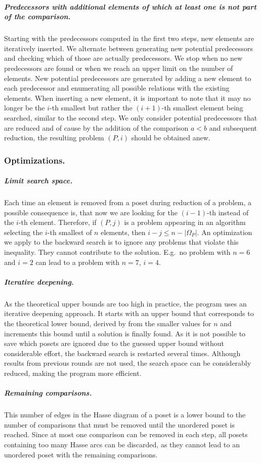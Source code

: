 \documentclass[a4paper,UKenglish,cleveref, autoref, thm-restate, anonymous]{lipics-v2021}
\begin{document}
\subparagraph{Predecessors with additional elements of which at least one is not part of the comparison.}
Starting with the predecessors computed in the first two steps, new elements are iteratively inserted.
We alternate between generating new potential predecessors and checking which of those are actually predecessors.
We stop when no new predecessors are found or when we reach an upper limit on the number of elements.
New potential predecessors are generated by adding a new element to each predecessor and enumerating all possible relations with the existing elements.
When inserting a new element, it is important to note that it may no longer be the $i$-th smallest but rather the $(i + 1)$-th smallest element being searched, similar to the second step.
We only consider potential predecessors that are reduced and of cause by the addition of the comparison $a < b$ and subsequent reduction, the resulting problem $(P, i)$ should be obtained anew.

\subsubsection{Optimizations.}

\subparagraph{Limit search space.}
Each time an element is removed from a poset during reduction of a problem, a possible consequence is, that now we are looking for the $(i-1)$-th instead of the $i$-th element.
Therefore, if $(P, j)$ is a problem appearing in an algorithm selecting the $i$-th smallest of $n$ elements, then $i - j \le n - |\Omega_P|$.
An optimization we apply to the backward search is to ignore any problems that violate this inequality.
They cannot contribute to the solution.
E.g.\ no problem with $n=6$ and $i=2$ can lead to a problem with $n=7$, $i=4$.

\subparagraph{Iterative deepening.}
As the theoretical upper bounds are too high in practice, the program uses an iterative deepening approach.
It starts with an upper bound that corresponds to the theoretical lower bound, derived by  from the smaller values for $n$ and increments this bound until a solution is finally found.
As it is not possible to save which posets are ignored due to the guessed upper bound without considerable effort, the backward search is restarted several times.
Although results from previous rounds are not used, the search space can be considerably reduced, making the program more efficient.

\subparagraph{Remaining comparisons.}
This number of edges in the Hasse diagram of a poset is a lower bound to the number of comparisons that must be removed until the unordered poset is reached.
Since at most one comparison can be removed in each step, all posets containing too many Hasse arcs can be discarded, as they cannot lead to an unordered poset with the remaining comparisons.
\end{document}
